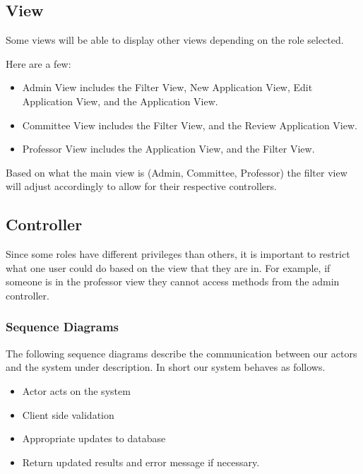 \documentclass[fontsize=12pt,paper=letter,twoside]{scrartcl}
\begin{document}
\subsection{View}
Some views will be able to display other views depending on the role selected.

\smallskip 
\noindent Here are a few:

\begin{itemize}
\item Admin View includes the Filter View, New Application View, Edit Application View,  and the Application View.
\item Committee View includes the Filter View, and the Review Application View.
\item Professor View includes the Application View, and the Filter View.
\end{itemize}

\noindent Based on what the main view is (Admin, Committee, Professor) the filter view will adjust accordingly to allow for their respective controllers.


\subsection{Controller}

Since some roles have different privileges than others, it is important to restrict what one user could do based on the view that they are in. For example, if someone is in the professor view they cannot access methods from the admin controller.

\subsubsection{Sequence Diagrams}

The following sequence diagrams describe the communication between our actors and the system under description. In short our system behaves as follows.

\begin{itemize}
\item Actor acts on the system
\item Client side validation
\item Appropriate updates to database
\item Return updated results and error message if necessary.
\end{itemize}
\end{document}
